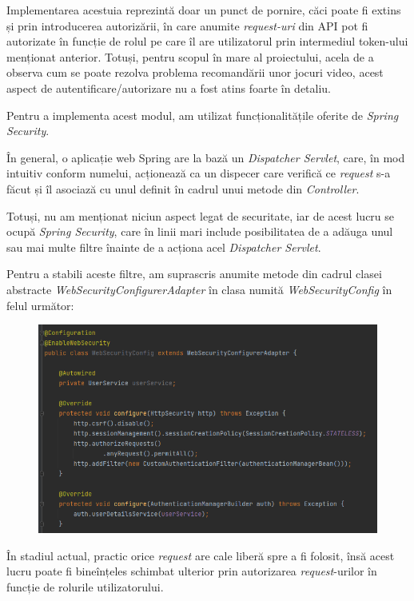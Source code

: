 \documentclass[12pt,a4paper]{report}
\begin{document}
Implementarea acestuia reprezintă doar un punct de pornire, căci poate fi extins și prin introducerea autorizării, în care anumite \emph{request-uri} din API pot fi autorizate în funcție de rolul pe care îl are utilizatorul prin intermediul token-ului menționat anterior. Totuși, pentru scopul în mare al proiectului, acela de a observa cum se poate rezolva problema recomandării unor jocuri video, acest aspect de autentificare/autorizare nu a fost atins foarte în detaliu.

Pentru a implementa acest modul, am utilizat funcționalitățile oferite de \emph{Spring Security}. \cite{25}

În general, o aplicație web Spring are la bază un \emph{Dispatcher Servlet}, care, în mod intuitiv conform numelui, acționează ca un dispecer care verifică ce \emph{request} s-a făcut și îl asociază cu unul definit în cadrul unui metode din \emph{Controller}. \cite{26}

Totuși, nu am menționat niciun aspect legat de securitate, iar de acest lucru se ocupă \emph{Spring Security}, care în linii mari include posibilitatea de a adăuga unul sau mai multe filtre înainte de a acționa acel \emph{Dispatcher Servlet}.

Pentru a stabili aceste filtre, am suprascris anumite metode din cadrul clasei abstracte \emph{WebSecurityConfigurerAdapter} în clasa numită \emph{WebSecurityConfig} în felul următor:

\begin{figure}[H]
\centering
\caption{}
\includegraphics[scale = 0.7]{exemplu_23_security}
\caption*{}
\end{figure}

În stadiul actual, practic orice \emph{request} are cale liberă spre a fi folosit, însă acest lucru poate fi bineînțeles schimbat ulterior prin autorizarea \emph{request}-urilor în funcție de rolurile utilizatorului.
\end{document}
